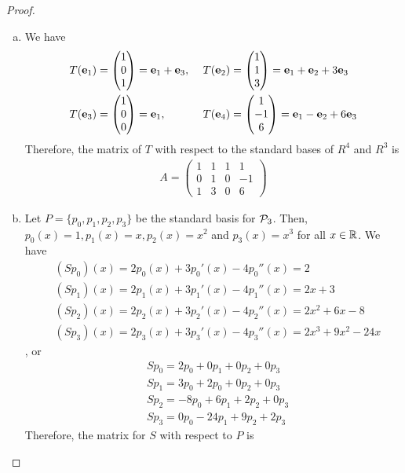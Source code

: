 \begin{proof}
    \renewcommand{\qedsymbol}{$\blacksquare$}
    \begin{enumerate}[(a)]
        \item We have 
        \[
            \begin{aligned}
                T(\textbf{e}_1) &= \ColVecThree{1}{0}{1}=\textbf{e}_1+\textbf{e}_3,\
                &&T(\textbf{e}_2) = \ColVecThree{1}{1}{3}=\textbf{e}_1+\textbf{e}_2+3\textbf{e}_3\\
                T(\textbf{e}_3) &= \ColVecThree{1}{0}{0}=\textbf{e}_1,\
                &&T(\textbf{e}_4) = \ColVecThree{1}{-1}{6}=\textbf{e}_1-\textbf{e}_2+6\textbf{e}_3
            \end{aligned}
        \]
        Therefore, the matrix of $T$ with respect to the standard bases of $R^4$ and $R^3$ is 
        \[
            \begin{aligned}
                A=\begin{pmatrix}
                    1 & 1 & 1 & 1\\
                    0 & 1 & 0 & -1\\
                    1 & 3 & 0 & 6
                \end{pmatrix}
            \end{aligned}
        \]
        \item Let $P=\{p_0,p_1,p_2,p_3\}$ be the standard basis for $\P_3$.
        Then, $p_0(x)=1,p_1(x)=x,p_2(x)=x^2$ and $p_3(x)=x^3$ for all $x\in\R$.
        We have
        \[
            \begin{aligned}
                &(Sp_0)(x)=2p_0(x)+3p_0'(x)-4p_0''(x)=2\\
                &(Sp_1)(x)=2p_1(x)+3p_1'(x)-4p_1''(x)=2x+3\\
                &(Sp_2)(x)=2p_2(x)+3p_2'(x)-4p_2''(x)=2x^2+6x-8\\
                &(Sp_3)(x)=2p_3(x)+3p_3'(x)-4p_3''(x)=2x^3+9x^2-24x
            \end{aligned}
        \]
        , or 
        \[
            \begin{aligned}
                &Sp_0=2p_0+0p_1+0p_2+0p_3\\
                &Sp_1=3p_0+2p_0+0p_2+0p_3\\
                &Sp_2=-8p_0+6p_1+2p_2+0p_3\\
                &Sp_3=0p_0-24p_1+9p_2+2p_3
            \end{aligned}
        \]
        Therefore, the matrix for $S$ with respect to $P$ is 

\end{enumerate}
\end{proof}
